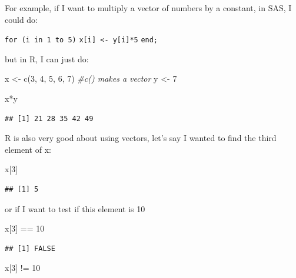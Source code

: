 \documentclass[
]{article}
\newenvironment{Shaded}{\begin{snugshade}}{\end{snugshade}}
\newcommand{\CommentTok}[1]{\textcolor[rgb]{0.56,0.35,0.01}{\textit{#1}}}
\newcommand{\DecValTok}[1]{\textcolor[rgb]{0.00,0.00,0.81}{#1}}
\newcommand{\FunctionTok}[1]{\textcolor[rgb]{0.00,0.00,0.00}{#1}}
\newcommand{\NormalTok}[1]{#1}
\newcommand{\OtherTok}[1]{\textcolor[rgb]{0.56,0.35,0.01}{#1}}
\newcommand{\SpecialCharTok}[1]{\textcolor[rgb]{0.00,0.00,0.00}{#1}}
\begin{document}
For example, if I want to multiply a vector of numbers by a constant, in
SAS, I could do:

\texttt{for\ (i\ in\ 1\ to\ 5)} \texttt{x{[}i{]}\ \textless{}-\ y{[}i{]}*5} \texttt{end;}

but in R, I can just do:

\begin{Shaded}
\begin{Highlighting}[]
\NormalTok{x }\OtherTok{\textless{}{-}} \FunctionTok{c}\NormalTok{(}\DecValTok{3}\NormalTok{, }\DecValTok{4}\NormalTok{, }\DecValTok{5}\NormalTok{, }\DecValTok{6}\NormalTok{, }\DecValTok{7}\NormalTok{)}
\CommentTok{\#c() makes a vector}
\NormalTok{y }\OtherTok{\textless{}{-}} \DecValTok{7}

\NormalTok{x}\SpecialCharTok{*}\NormalTok{y}
\end{Highlighting}
\end{Shaded}

\begin{verbatim}
## [1] 21 28 35 42 49
\end{verbatim}

R is also very good about using vectors, let's say I wanted to find the
third element of x:

\begin{Shaded}
\begin{Highlighting}[]
\NormalTok{x[}\DecValTok{3}\NormalTok{]}
\end{Highlighting}
\end{Shaded}

\begin{verbatim}
## [1] 5
\end{verbatim}

or if I want to test if this element is 10

\begin{Shaded}
\begin{Highlighting}[]
\NormalTok{x[}\DecValTok{3}\NormalTok{] }\SpecialCharTok{==} \DecValTok{10}
\end{Highlighting}
\end{Shaded}

\begin{verbatim}
## [1] FALSE
\end{verbatim}

\begin{Shaded}
\begin{Highlighting}[]
\NormalTok{x[}\DecValTok{3}\NormalTok{] }\SpecialCharTok{!=} \DecValTok{10}
\end{Highlighting}
\end{Shaded}
\end{document}
